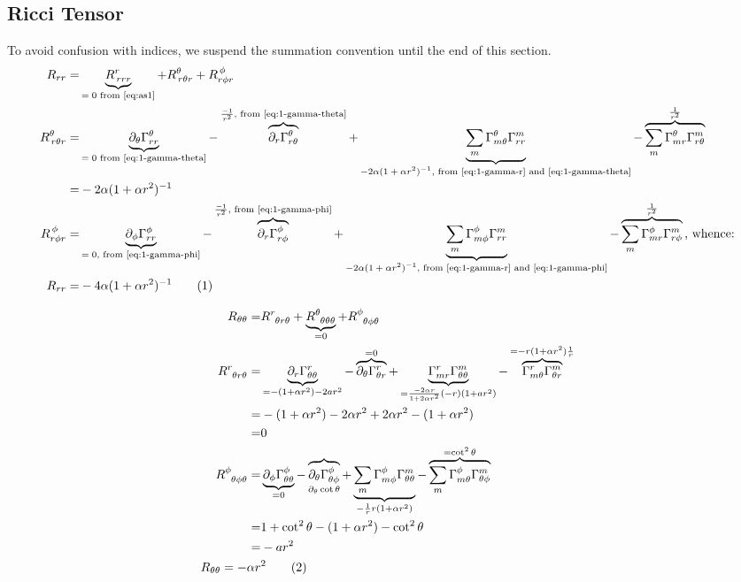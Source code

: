 \documentclass[]{article}
\newcommand\numberthis{\addtocounter{equation}{1}\tag{\theequation}}
\begin{document}
\subsection{Ricci Tensor}
To avoid confusion with indices, we suspend the summation convention until the end of this section.
\begin{align*}
R_{rr}=&\underbrace{R^r_{\,rrr}}_\text{$=0$ from \eqref{eq:as1}}+R^{\theta}_{\,r\theta r}+R^{\,\phi}_{r\phi r}\\
R^{\theta}_{\,r\theta r}=&\underbrace{\partial_{\theta}\Gamma^{\theta}_{rr}}_\text{$=0$ from \eqref{eq:1-gamma-theta}}-\overbrace{\partial_r\Gamma^{\theta}_{r\theta}}^\text{$\frac{-1}{r^2}$, from \eqref{eq:1-gamma-theta}}+\underbrace{\sum_m\Gamma^{\theta}_{m\theta}\Gamma^{m}_{rr}}_\text{$-2 \alpha (1+\alpha r^2)^{-1}$, from \eqref{eq:1-gamma-r} and \eqref{eq:1-gamma-theta}}-\overbrace{\sum_m\Gamma^{\theta}_{mr}\Gamma^m_{r\theta}}^\text{$\frac{1}{r^2}$}\\
=&-2 \alpha (1+\alpha r^2)^{-1}\\
R^{\,\phi}_{r\phi r}=&\underbrace{\partial_{\phi}\Gamma^{\phi}_{rr}}_\text{$=0$, from \eqref{eq:1-gamma-phi}}-\overbrace{\partial_r\Gamma^{\phi}_{r\phi}}^\text{$\frac{-1}{r^2}$, from \eqref{eq:1-gamma-phi}}+\underbrace{\sum_m\Gamma^{\phi}_{m\phi}\Gamma^{m}_{rr}}_\text{$-2 \alpha (1+\alpha r^2)^{-1}$, from \eqref{eq:1-gamma-r} and \eqref{eq:1-gamma-phi}}-\overbrace{\sum_m\Gamma^{\phi}_{mr}\Gamma^m_{r\phi}}^\text{$\frac{1}{r^2}$}\text{, whence:}\\
R_{rr}=&-4 \alpha (1+\alpha r^2)^{-1}\numberthis\label{eq:R-r-r}
\end{align*}

\begin{align*}
R_{\theta\theta}=&R\indices{^r_{\theta r\theta}}+\underbrace{R\indices{^{\theta}_{\theta\theta\theta}}}_{=0}+R\indices{^{\phi}_{\theta\phi\theta}}\\
R\indices{^r_{\theta r\theta}}=&\underbrace{\partial_r\Gamma^r_{\theta\theta}}_{=-(1+\alpha r^2)-2ar^2}-\overbrace{\partial_\theta\Gamma^r_{\theta r}}^{=0}+\underbrace{\Gamma^r_{mr}\Gamma^m_{\theta\theta}}_{=\frac{-2\alpha r}{1+2\alpha r^2}(-r)(1+ar^2)}-\overbrace{\Gamma^r_{m\theta}\Gamma^m_{\theta r}}^{=-r(1+\alpha r^2)\frac{1}{r}}\\
=&-(1+\alpha r^2)-2\alpha r^2 + 2\alpha r^2-(1+\alpha r^2)\\
=&0\\
R\indices{^{\phi}_{\theta\phi\theta}}=&\underbrace{\partial_{\phi}\Gamma^{\phi}_{\theta\theta}}_{=0}-\overbrace{\partial_{\theta}\Gamma^{\phi}_{\theta\phi}}_{\partial_{\theta}\cot\theta}+\underbrace{\sum_m\Gamma^{\phi}_{m\phi}\Gamma^m_{\theta\theta}}_{-\frac{1}{r}r(1+\alpha r^2)}-\overbrace{\sum_m\Gamma^{\phi}_{m\theta}\Gamma^{m}_{\theta\phi}}^{=\cot^2\theta}\\
=&1+\cot^2\theta-(1+\alpha r^2)-\cot^2\theta\\
=&-ar^2\\
R_{\theta\theta} = -\alpha r&^2\numberthis\label{eq:R-theta-theta}
\end{align*}
\end{document}

